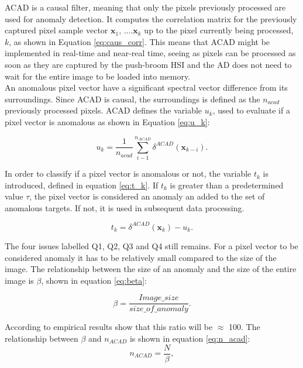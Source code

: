 ACAD is a causal filter, meaning that only the pixels previously processed are used for anomaly detection.  It computes the correlation matrix for the previously captured pixel sample vector {$\textbf{x}_1$, ....$\textbf{x}_k$} up to the pixel currently being processed, $k$, as shown in Equation \ref{eq:caus_corr}. This means that ACAD might be implemented in real-time and near-real time, seeing as pixels can be processed as soon as they are captured by the push-broom HSI and the AD does not need to wait for the entire image to be loaded into memory. \\

An anomalous pixel vector have a significant spectral vector difference from its surroundings. Since ACAD is causal, the surroundings is defined as the $n_{acad}$ previously processed pixels. %
ACAD defines the variable $u_k$, used to evaluate if a pixel vector is anomalous as shown in  Equation \ref{eq:u_k}: 

\begin{equation}
    u_k = \frac{1}{n_{acad}}\sum_{i-1}^{n_{ACAD}}  \delta^{ACAD}(\textbf{x}_{k-i}).
    \label{eq:u_k}
\end{equation}

 In order to classify if a pixel vector is anomalous or not, the variable $t_k$ is introduced, defined in equation \ref{eq:t_k}. If $t_k$ is greater than a predetermined value $\tau$, the pixel vector is considered an anomaly an added to the set of anomalous targets. If not, it is used in subsequent data processing. 

\begin{equation}
    t_k = \delta^{ACAD}(\textbf{x}_{k}) - u_k.
    \label{eq:t_k}
\end{equation}


The four issues labelled Q1, Q2, Q3 and Q4 still remains. For a pixel vector to be considered anomaly it has to be relatively small compared to the size of the image. The relationship between the size of an anomaly and the size of the entire image is $\beta$, shown in equation \ref{eq:beta}:

\begin{equation}
    \beta  = \frac{Image\_size}{size\_of\_anomaly}.
    \label{eq:beta}
\end{equation}

According to \cite{chang2006characterization} empirical results show that this ratio will be $\approx$ 100.
The relationship between $\beta$ and $n_{ACAD}$ is shown in equation \ref{eq:n_acad}:
\begin{equation}
    n_{ACAD} = \frac{N}{\beta},
    \label{eq:n_acad}
\end{equation}


